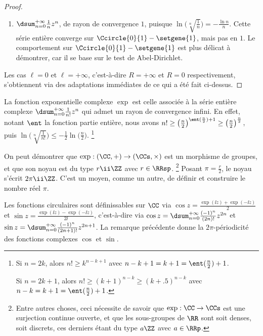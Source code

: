 \begin{proof}
\begin{itemize}
\begin{enumerate}[label=(\alph*)]
	        \item $\dsum_{n=0}^{+\infty}  \frac{1}{n} z^n$, 
	        de rayon de convergence $1$,
	        puisque 
	        $ \ln \big( \sqrt[n]{\frac{1}{n}} \big)
	        = -\frac{\ln n}{n}$.
	        Cette série entière converge sur $\Ccircle{0}{1} - \setgene{1}$, mais pas en $1$. 
	        Le comportement sur $\Ccircle{0}{1} - \setgene{1}$ est plus délicat à démontrer, car il se base sur le test de Abel-Dirichlet.
	    \end{enumerate}
    \end{itemize}


    Les cas $\ell = 0$ et $\ell = +\infty$,
    c'est-à-dire $R = +\infty$ et $R = 0$ respectivement,
    s'obtiennent via des adaptations immédiates de ce qui a été fait ci-dessus.
\end{proof}


\begin{example}
	La fonction exponentielle complexe $\exp$ est celle associée à la série entière complexe $\dsum_{n=0}^{+\infty} \frac{1}{n!} z^n$ qui admet un rayon de convergence infini.
	En effet,
	notant $\ent$ la fonction partie entière, nous avons
	$n! \geq \big( \frac{n}{2} \big)^{\ent (\frac{n}{2}) + 1} \geq \big( \frac{n}{2} \big)^{\frac{n}{2}}$,
	puis
	$ \ln \big( \sqrt[n]{\frac{1}{n!}} \big)
	\leq
	  - \frac{1}{2} \ln \big( \frac{n}{2} \big)$.%
	\footnote{
		Si $n = 2k$, alors $n! \geq k^{n - k + 1}$
		avec $n - k + 1 = k + 1 = \ent (\frac{n}{2}) + 1$.
		
		\leavevmode\kern7.75pt
		Si $n = 2k + 1$, alors $n! \geq (k + 1)^{n - k} \geq (k + \num{.5})^{n - k}$
		avec $n - k = k + 1 = \ent (\frac{n}{2}) + 1$.
	}
\end{example}


\begin{remark}
	On peut démontrer que
	$\exp : (\CC , {+}) \to (\CCs, {\times})$ est un morphisme de groupes, et que son noyau est du type $r \ii \ZZ$ avec $r \in \RRsp$.%
	\footnote{
	    Entre autres choses, ceci nécessite de savoir que
	    $\exp: \CC \to \CCs$ est une surjection continue ouverte,
	    et
	    que les sous-groupes de $\RR$ sont soit denses, soit discrets, ces derniers étant du type $a \ZZ$ avec $a \in \RRp$. 
	}
	Posant $\pi = \frac{r}{2}$, le noyau s'écrit $2 \pi \ii \ZZ$.
	C'est un moyen, comme un autre, de définir et construire le nombre réel $\pi$.
\end{remark}


\begin{example} \label{cos-sin-analytic}
    Les fonctions circulaires sont définissables sur $\CC$ via
    $\cos z = \frac{\exp(\ii z) + \exp(- \ii z)}{2}$
    et
    $\sin z = \frac{\exp(\ii z) - \exp(- \ii z)}{2 \ii}$,
    c'est-à-dire via
    $\cos z = \dsum_{n=0}^{+\infty} \frac{(-1)^n}{(2n)!} z^{2n}$
    et
    $\sin z = \dsum_{n=0}^{+\infty} \frac{(-1)^n}{(2n+ 1)!} z^{2n+1}$.
    La remarque précédente donne la $2 \pi$-périodicité des fonctions complexes $\cos$ et $\sin$.
\end{example}


